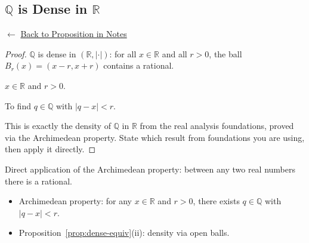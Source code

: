
\subsection*{$\mathbb{Q}$ is Dense in $\mathbb{R}$}
\label{prf:Q-dense-R}

\begin{remark*}[Return]
$\leftarrow$ \hyperref[prop:Q-dense-R]{Back to Proposition in Notes}
\end{remark*}

\begin{proof}
\Claim $\mathbb{Q}$ is dense in $(\mathbb{R}, |\cdot|)$: for all $x \in \mathbb{R}$
and all $r > 0$, the ball $B_r(x) = (x-r, x+r)$ contains a rational.

\Given $x \in \mathbb{R}$ and $r > 0$.

\Goal To find $q \in \mathbb{Q}$ with $|q - x| < r$.

\Strategy This is exactly the density of $\mathbb{Q}$ in $\mathbb{R}$
from the real analysis foundations, proved via the Archimedean property.
State which result from foundations you are using, then apply it directly.


\end{proof}

\begin{remark*}
Direct application of the Archimedean property: between any two real
numbers there is a rational.
\end{remark*}

\begin{remark*}[Dependencies]
\begin{itemize}
  \item Archimedean property: for any $x \in \mathbb{R}$ and $r > 0$,
        there exists $q \in \mathbb{Q}$ with $|q - x| < r$.
  \item Proposition~\ref{prop:dense-equiv}(ii): density via open balls.
\end{itemize}
\end{remark*}
